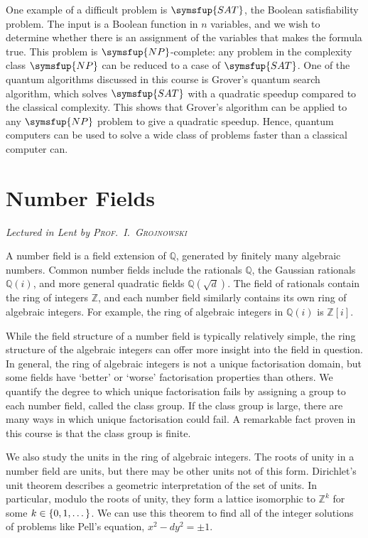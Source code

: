 One example of a difficult problem is \( \symsfup{SAT} \), the Boolean satisfiability problem.
The input is a Boolean function in \( n \) variables, and we wish to determine whether there is an assignment of the variables that makes the formula true.
This problem is \( \symsfup{NP} \)-complete: any problem in the complexity class \( \symsfup{NP} \) can be reduced to a case of \( \symsfup{SAT} \).
One of the quantum algorithms discussed in this course is Grover's quantum search algorithm, which solves \( \symsfup{SAT} \) with a quadratic speedup compared to the classical complexity.
This shows that Grover's algorithm can be applied to any \( \symsfup{NP} \) problem to give a quadratic speedup.
Hence, quantum computers can be used to solve a wide class of problems faster than a classical computer can.



\chapter[Number Fields \\ \textnormal{\emph{Lectured in Lent \oldstylenums{2023} by \textsc{Prof.\ I.\ Grojnowski}}}]{Number Fields}
\emph{\Large Lectured in Lent  by \textsc{Prof.\ I.\ Grojnowski}}

A number field is a field extension of \( \mathbb Q \), generated by finitely many algebraic numbers.
Common number fields include the rationals \( \mathbb Q \), the Gaussian rationals \( \mathbb Q(i) \), and more general quadratic fields \( \mathbb Q(\sqrt{d}) \).
The field of rationals contain the ring of integers \( \mathbb Z \), and each number field similarly contains its own ring of algebraic integers.
For example, the ring of algebraic integers in \( \mathbb Q(i) \) is \( \mathbb Z[i] \).

While the field structure of a number field is typically relatively simple, the ring structure of the algebraic integers can offer more insight into the field in question.
In general, the ring of algebraic integers is not a unique factorisation domain, but some fields have `better' or `worse' factorisation properties than others.
We quantify the degree to which unique factorisation fails by assigning a group to each number field, called the class group.
If the class group is large, there are many ways in which unique factorisation could fail.
A remarkable fact proven in this course is that the class group is finite.

We also study the units in the ring of algebraic integers.
The roots of unity in a number field are units, but there may be other units not of this form.
Dirichlet's unit theorem describes a geometric interpretation of the set of units.
In particular, modulo the roots of unity, they form a lattice isomorphic to \( \mathbb Z^k \) for some \( k \in \qty{0, 1, \dots} \).
We can use this theorem to find all of the integer solutions of problems like Pell's equation, \( x^2 - d y^2 = \pm 1 \).

